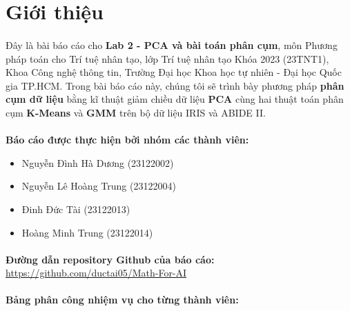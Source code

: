 \newpage
\section{Giới thiệu}

\paragraph{}{Đây là bài báo cáo cho \textbf{Lab 2 - PCA và bài toán phân cụm}, môn Phương pháp toán cho Trí tuệ nhân tạo, lớp Trí tuệ nhân tạo Khóa 2023 (23TNT1), Khoa Công nghệ thông tin, Trường Đại học Khoa học tự nhiên - Đại học Quốc gia TP.HCM. Trong bài báo cáo này, chúng tôi sẽ trình bày phương pháp \textbf{phân cụm dữ liệu} bằng kĩ thuật giảm chiều dữ liệu \textbf{PCA} cùng hai thuật toán phân cụm \textbf{K-Means} và \textbf{GMM} trên bộ dữ liệu IRIS và ABIDE II.}

\paragraph{}{\textbf{Báo cáo được thực hiện bởi nhóm các thành viên:}} 
\begin{itemize}
    \item Nguyễn Đình Hà Dương (23122002)
    \item Nguyễn Lê Hoàng Trung (23122004)
    \item Đinh Đức Tài (23122013)
    \item Hoàng Minh Trung (23122014)
\end{itemize}

\paragraph{}{\textbf{Đường dẫn repository Github của báo cáo:}} \href{https://github.com/ductai05/Math-For-AI}{https://github.com/ductai05/Math-For-AI} \cite{repo}

\paragraph{}{\textbf{Bảng phân công nhiệm vụ cho từng thành viên:}}


